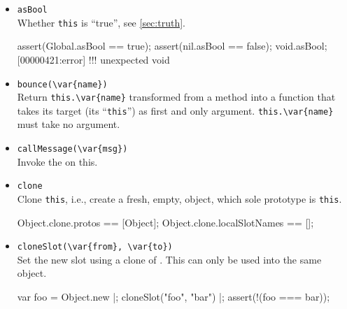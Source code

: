 \begin{itemize}
\item \lstinline|asBool|\\
  Whether \lstinline|this| is ``true'', see \autoref{sec:truth}.
\begin{urbiscript}
assert(Global.asBool == true);
assert(nil.asBool ==    false);
void.asBool;
[00000421:error] !!! unexpected void
\end{urbiscript}

\item \lstinline|bounce(\var{name})|\\
  Return \lstinline|this.\var{name}| transformed from a method into a
  function that takes its target (its ``\lstinline|this|'') as first
  and only argument.  \lstinline|this.\var{name}| must take no
  argument.

\item \lstinline|callMessage(\var{msg})|\\
  Invoke the   on this.

\item \lstinline|clone|\\
  Clone \lstinline|this|, i.e., create a fresh, empty, object, which
  sole prototype is \lstinline|this|.
\begin{urbiassert}
Object.clone.protos == [Object];
Object.clone.localSlotNames == [];
\end{urbiassert}

\item \lstinline|cloneSlot(\var{from}, \var{to})|\\
  Set the new slot  using a clone of . This can only
  be used into the same object.

\begin{urbiscript}
var foo = Object.new |;
cloneSlot("foo", "bar") |;
assert(!(foo === bar));
\end{urbiscript}


\end{itemize}

